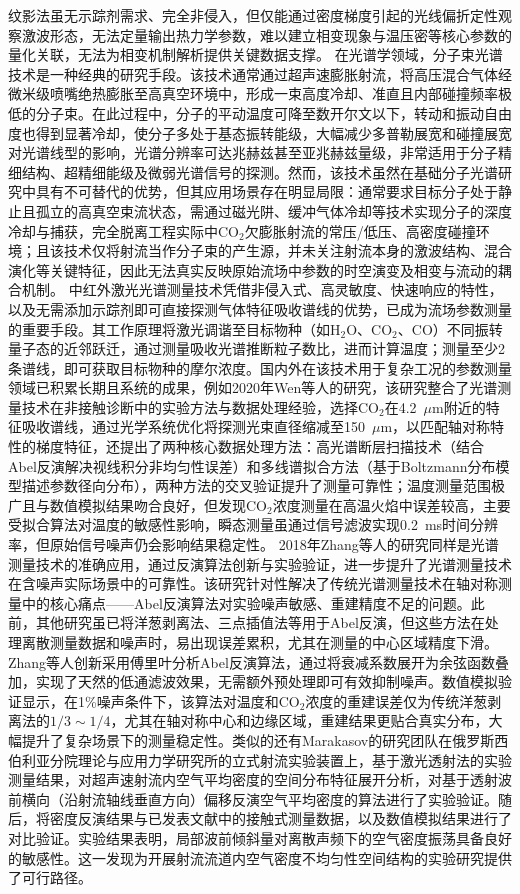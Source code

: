 纹影法虽无示踪剂需求、完全非侵入，但仅能通过密度梯度引起的光线偏折定性观察激波形态\supercite{hirschberg2002}，无法定量输出热力学参数，难以建立相变现象与温压密等核心参数的量化关联，无法为相变机制解析提供关键数据支撑。
在光谱学领域，分子束光谱技术是一种经典的研究手段。该技术通常通过超声速膨胀射流，将高压混合气体经微米级喷嘴绝热膨胀至高真空环境中，形成一束高度冷却、准直且内部碰撞频率极低的分子束\supercite{jansen2024}。在此过程中，分子的平动温度可降至数开尔文以下，转动和振动自由度也得到显著冷却，使分子多处于基态振转能级，大幅减少多普勒展宽和碰撞展宽对光谱线型的影响，光谱分辨率可达兆赫兹甚至亚兆赫兹量级，非常适用于分子精细结构、超精细能级及微弱光谱信号的探测。然而，该技术虽然在基础分子光谱研究中具有不可替代的优势，但其应用场景存在明显局限：通常要求目标分子处于静止且孤立的高真空束流状态，需通过磁光阱、缓冲气体冷却等技术实现分子的深度冷却与捕获，完全脱离工程实际中CO$_2$欠膨胀射流的常压/低压、高密度碰撞环境；且该技术仅将射流当作分子束的产生源，并未关注射流本身的激波结构、混合演化等关键特征，因此无法真实反映原始流场中参数的时空演变及相变与流动的耦合机制。
中红外激光光谱测量技术凭借非侵入式、高灵敏度、快速响应的特性，以及无需添加示踪剂即可直接探测气体特征吸收谱线的优势，已成为流场参数测量的重要手段。其工作原理将激光调谐至目标物种（如H$_2$O、CO$_2$、CO）不同振转量子态的近邻跃迁，通过测量吸收光谱推断粒子数比，进而计算温度；测量至少2条谱线，即可获取目标物种的摩尔浓度。国内外在该技术用于复杂工况的参数测量领域已积累长期且系统的成果\supercite{zapryagaev2018}，例如2020年Wen等人的研究\supercite{wen2020}，该研究整合了光谱测量技术在非接触诊断中的实验方法与数据处理经验，选择CO$_2$在4.2~$\mu$m附近的特征吸收谱线，通过光学系统优化将探测光束直径缩减至150~$\mu$m，以匹配轴对称特性的梯度特征\supercite{yan2023}，还提出了两种核心数据处理方法：高光谱断层扫描技术（结合Abel反演解决视线积分非均匀性误差）\supercite{hickstein2019}和多线谱拟合方法（基于Boltzmann分布模型描述参数径向分布），两种方法的交叉验证提升了测量可靠性；温度测量范围极广且与数值模拟结果吻合良好，但发现CO$_2$浓度测量在高温火焰中误差较高，主要受拟合算法对温度的敏感性影响，瞬态测量虽通过信号滤波实现0.2~ms时间分辨率，但原始信号噪声仍会影响结果稳定性。
2018年Zhang等人的研究同样是光谱测量技术的准确应用\supercite{zhang2018}，通过反演算法创新与实验验证，进一步提升了光谱测量技术在含噪声实际场景中的可靠性。该研究针对性解决了传统光谱测量技术在轴对称测量中的核心痛点——Abel反演算法对实验噪声敏感、重建精度不足的问题。此前，其他研究虽已将洋葱剥离法、三点插值法等用于Abel反演，但这些方法在处理离散测量数据和噪声时，易出现误差累积，尤其在测量的中心区域精度下滑。Zhang等人创新采用傅里叶分析Abel反演算法，通过将衰减系数展开为余弦函数叠加，实现了天然的低通滤波效果，无需额外预处理即可有效抑制噪声。数值模拟验证显示，在1\%噪声条件下，该算法对温度和CO$_2$浓度的重建误差仅为传统洋葱剥离法的$1/3\sim1/4$，尤其在轴对称中心和边缘区域，重建结果更贴合真实分布，大幅提升了复杂场景下的测量稳定性。类似的还有Marakasov的研究团队\supercite{marakasov2023}在俄罗斯西伯利亚分院理论与应用力学研究所的立式射流实验装置上，基于激光透射法的实验测量结果，对超声速射流内空气平均密度的空间分布特征展开分析，对基于透射波前横向（沿射流轴线垂直方向）偏移反演空气平均密度的算法进行了实验验证。随后，将密度反演结果与已发表文献中的接触式测量数据，以及数值模拟结果进行了对比验证。实验结果表明，局部波前倾斜量对离散声频下的空气密度振荡具备良好的敏感性。这一发现为开展射流流道内空气密度不均匀性空间结构的实验研究提供了可行路径。
